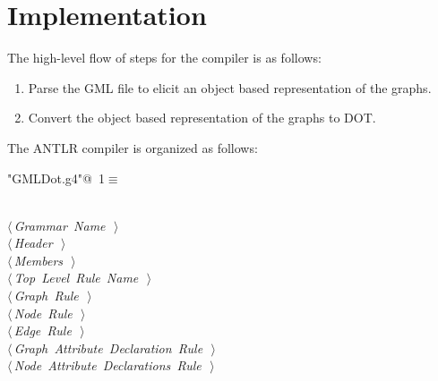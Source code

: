 \documentclass[a4paper]{report}
\begin{document}
\chapter{Implementation}
The high-level flow of steps for the compiler is as follows:
\begin{enumerate}
\item Parse the GML file to elicit an object based representation of the graphs.
\item Convert the object based representation of the graphs to DOT.
\end{enumerate}

The ANTLR compiler is organized as follows: 
\begin{flushleft} \small
\begin{minipage}{\linewidth}\label{scrap1}\raggedright\small
{} \verb@"GMLDot.g4"@\nobreak\ {\footnotesize {1}}$\equiv$
\vspace{-1ex}
\begin{list}{}{} \item
\mbox{}\verb@@\\
\mbox{}\verb@@\hbox{$\langle\,${\itshape Grammar Name}\nobreak\ {\footnotesize {}}$\,\rangle$}\verb@@\\
\mbox{}\verb@@\hbox{$\langle\,${\itshape Header}\nobreak\ {\footnotesize {}}$\,\rangle$}\verb@@\\
\mbox{}\verb@@\hbox{$\langle\,${\itshape Members}\nobreak\ {\footnotesize {}}$\,\rangle$}\verb@@\\
\mbox{}\verb@@\hbox{$\langle\,${\itshape Top Level Rule Name}\nobreak\ {\footnotesize {}}$\,\rangle$}\verb@@\\
\mbox{}\verb@@\hbox{$\langle\,${\itshape Graph Rule}\nobreak\ {\footnotesize {}}$\,\rangle$}\verb@@\\
\mbox{}\verb@@\hbox{$\langle\,${\itshape Node Rule}\nobreak\ {\footnotesize {}}$\,\rangle$}\verb@@\\
\mbox{}\verb@@\hbox{$\langle\,${\itshape Edge Rule}\nobreak\ {\footnotesize {}}$\,\rangle$}\verb@@\\
\mbox{}\verb@@\hbox{$\langle\,${\itshape Graph Attribute Declaration Rule}\nobreak\ {\footnotesize {}}$\,\rangle$}\verb@@\\
\mbox{}\verb@@\hbox{$\langle\,${\itshape Node Attribute Declarations Rule}\nobreak\ {\footnotesize {}}$\,\rangle$}\verb@@\\

\end{list}
\end{minipage}
\end{flushleft}
\end{document}

